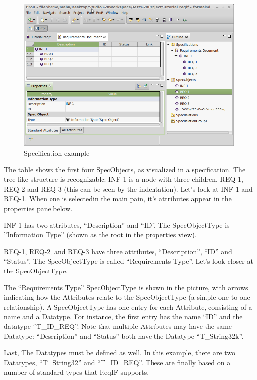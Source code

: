 \begin{figure}[H]
  \centering
  \includegraphics[width=\textwidth]{../rmf-images/screenshot_INF_1.png}
  \caption{Specification example}
  \label{fig:spec_example}
\end{figure}

The table shows the first four SpecObjects, as visualized in a specification.  The tree-like structure is recognizable: INF-1 is a node
with three children, REQ-1, REQ-2 and REQ-3 (this can be seen by the indentation).  Let's look at INF-1 and REQ-1.  When one is selectedin the main pain, it's attributes appear in the properties pane below.

INF-1 has two attributes, ``Description'' and ``ID''.  The SpecObjectType is ''Information Type'' (shown as the root in the properties view).

REQ-1, REQ-2, and REQ-3 have three attributes, ``Description'', ``ID'' and ``Status''.  The SpecObjectType is called ``Requirements Type''.  Let's look closer at the SpecObjectType.

The ``Requirements Type'' SpecObjectType is shown in the picture, with arrows indicating how the Attributes relate to the SpecObjectType (a simple one-to-one relationship).  A SpecObjectType has one entry for each Attribute, consisting of a name and a Datatype.  For instance, the first entry has the name ``ID'' and the datatype ``T\_ID\_REQ''.  Note that multiple Attributes may have the same Datatype: ``Description'' and ``Status'' both have the Datatype ``T\_String32k''.

Last, The Datatypes must be defined as well.  In this example, there are two Datatypes, ``T\_String32'' and ``T\_ID\_REQ''.  These are finally based on a number of standard types that ReqIF supports.

